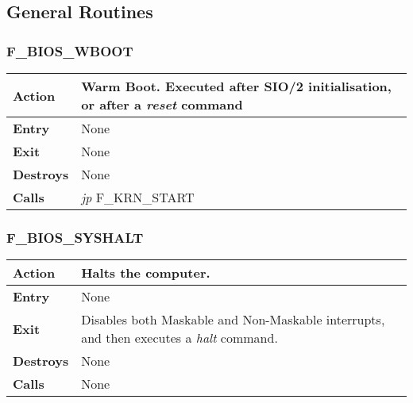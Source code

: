     \subsection{General Routines}

        \subsubsection{F\_BIOS\_WBOOT}
        \label{func:fbioswboot}
        \begin{tabular}{l p{15cm}}
            \hline\textbf{Action}
            & Warm Boot. Executed after \textbf{SIO/2} initialisation, or after a
            \textit{reset} command \\
            \hline\textbf{Entry} & None \\
            \hline\textbf{Exit} & None \\
            \hline\textbf{Destroys} & None \\
            \hline\textbf{Calls} & \textit{jp} F\_KRN\_START \\
            \hline
        \end{tabular}

        \subsubsection{F\_BIOS\_SYSHALT}
        \label{func:fbiossyshalt}
        \begin{tabular}{l p{15cm}}
            \hline\textbf{Action}
            & Halts the computer.\\
            \hline\textbf{Entry} & None \\
            \hline\textbf{Exit} & Disables both Maskable and Non-Maskable
            interrupts, and then executes a \textit{halt} command.\\
            \hline\textbf{Destroys} & None \\
            \hline\textbf{Calls} & None \\
            \hline
        \end{tabular}
